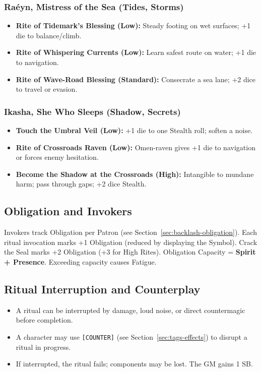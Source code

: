 \subsubsection{Ra\'eyn, Mistress of the Sea (Tides, Storms)}
\begin{itemize}
  \item \textbf{Rite of Tidemark's Blessing (Low):} Steady footing on wet surfaces; +1 die to balance/climb.
  \item \textbf{Rite of Whispering Currents (Low):} Learn safest route on water; +1 die to navigation.
  \item \textbf{Rite of Wave-Road Blessing (Standard):} Consecrate a sea lane; +2 dice to travel or evasion.
\end{itemize}

\subsubsection{Ikasha, She Who Sleeps (Shadow, Secrets)}
\begin{itemize}
  \item \textbf{Touch the Umbral Veil (Low):} +1 die to one Stealth roll; soften a noise.
  \item \textbf{Rite of Crossroads Raven (Low):} Omen-raven gives +1 die to navigation or forces enemy hesitation.
  \item \textbf{Become the Shadow at the Crossroads (High):} Intangible to mundane harm; pass through gaps; +2 dice Stealth.
\end{itemize}

\subsection{Obligation and Invokers}

Invokers track Obligation per Patron (see Section~\ref{sec:backlash-obligation}). Each ritual invocation marks +1 Obligation (reduced by displaying the Symbol). Crack the Seal marks +2 Obligation (+3 for High Rites). Obligation Capacity = \textbf{Spirit + Presence}. Exceeding capacity causes Fatigue.

\subsection{Ritual Interruption and Counterplay}
\begin{itemize}
  \item A ritual can be interrupted by damage, loud noise, or direct countermagic before completion.
  \item A character may use \texttt{[COUNTER]} (see Section~\ref{sec:tags-effects}) to disrupt a ritual in progress.
  \item If interrupted, the ritual fails; components may be lost. The GM gains 1 SB.
\end{itemize}

